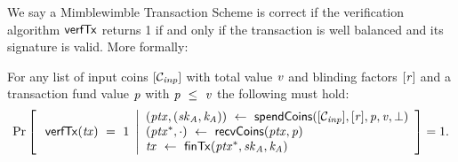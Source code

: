 We say a Mimblewimble Transaction Scheme is correct if the verification algorithm $\mathsf{verfTx}$ returns 1 if and only if the transaction is well balanced and its signature is valid.
More formally:
\begin{definition}
    \label{def:atom:tx-scheme-correctness}
    For any list of input coins $[\mathcal{C}_{\mathit{inp}}]$ with total value $\mathit{v}$ and blinding factors
    $[\mathit{r}]$ and a transaction fund value $\mathit{p}$ with $\mathit{p} ~\leq~ \mathit{v}$ the following must hold:
    \[
        \Pr\left[
        \begin{array}{c}
            \: \mathsf{verfTx}(\mathit{tx}) ~=~ 1
        \end{array}
        \middle\vert
        \begin{array}{l}
            (\mathit{ptx}, (\mathit{sk}_{\mathit{A}}, \mathit{\mathit{k}_{\mathit{A}}})) ~\leftarrow~ \mathsf{spendCoins}([\mathcal{C}_{\mathit{inp}}],[\mathit{r}],\mathit{p},\mathit{v},\bot) \\
            (\mathit{ptx}^*, \cdot) ~\leftarrow~ \mathsf{recvCoins}(\mathit{ptx},\mathit{p})                                                          \\
            \mathit{tx} ~\leftarrow~ \mathsf{finTx}(\mathit{ptx}^*,\mathit{sk}_{\mathit{A}},\mathit{\mathit{k}_{\mathit{A}}})
        \end{array}
        \right]=1.
    \]
\end{definition}

